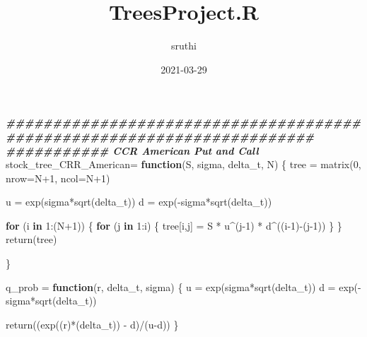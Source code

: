 \documentclass[
]{article}
\title{TreesProject.R}
\author{sruthi}
\date{2021-03-29}
\newenvironment{Shaded}{\begin{snugshade}}{\end{snugshade}}
\newcommand{\AttributeTok}[1]{\textcolor[rgb]{0.77,0.63,0.00}{#1}}
\newcommand{\ControlFlowTok}[1]{\textcolor[rgb]{0.13,0.29,0.53}{\textbf{#1}}}
\newcommand{\DecValTok}[1]{\textcolor[rgb]{0.00,0.00,0.81}{#1}}
\newcommand{\DocumentationTok}[1]{\textcolor[rgb]{0.56,0.35,0.01}{\textbf{\textit{#1}}}}
\newcommand{\FunctionTok}[1]{\textcolor[rgb]{0.00,0.00,0.00}{#1}}
\newcommand{\NormalTok}[1]{#1}
\newcommand{\OtherTok}[1]{\textcolor[rgb]{0.56,0.35,0.01}{#1}}
\newcommand{\SpecialCharTok}[1]{\textcolor[rgb]{0.00,0.00,0.00}{#1}}
\begin{document}
\maketitle

\begin{Shaded}
\begin{Highlighting}[]
\DocumentationTok{\#\#\#\#\#\#\#\#\#\#\#\#\#\#\#\#\#\#\#\#\#\#\#\#\#\#\#\#\#\#\#\#\#\#\#\#\#\#\#\#\#\#\#\#\#\#\#\#\#\#\#\#\#\#\#\#\#\#\#\#\#\#\#\#\#\#\#\#\#\#\#}
\DocumentationTok{\#\#\#\#\#\#\#\#\#\#\# CCR American Put and Call}
\NormalTok{stock\_tree\_CRR\_American}\OtherTok{=} \ControlFlowTok{function}\NormalTok{(S, sigma, delta\_t, N) \{}
\NormalTok{  tree }\OtherTok{=} \FunctionTok{matrix}\NormalTok{(}\DecValTok{0}\NormalTok{, }\AttributeTok{nrow=}\NormalTok{N}\SpecialCharTok{+}\DecValTok{1}\NormalTok{, }\AttributeTok{ncol=}\NormalTok{N}\SpecialCharTok{+}\DecValTok{1}\NormalTok{)}
  
\NormalTok{  u }\OtherTok{=} \FunctionTok{exp}\NormalTok{(sigma}\SpecialCharTok{*}\FunctionTok{sqrt}\NormalTok{(delta\_t))}
\NormalTok{  d }\OtherTok{=} \FunctionTok{exp}\NormalTok{(}\SpecialCharTok{{-}}\NormalTok{sigma}\SpecialCharTok{*}\FunctionTok{sqrt}\NormalTok{(delta\_t))}
  
  \ControlFlowTok{for}\NormalTok{ (i }\ControlFlowTok{in} \DecValTok{1}\SpecialCharTok{:}\NormalTok{(N}\SpecialCharTok{+}\DecValTok{1}\NormalTok{)) \{}
    \ControlFlowTok{for}\NormalTok{ (j }\ControlFlowTok{in} \DecValTok{1}\SpecialCharTok{:}\NormalTok{i) \{}
\NormalTok{      tree[i,j] }\OtherTok{=}\NormalTok{ S }\SpecialCharTok{*}\NormalTok{ u}\SpecialCharTok{\^{}}\NormalTok{(j}\DecValTok{{-}1}\NormalTok{) }\SpecialCharTok{*}\NormalTok{ d}\SpecialCharTok{\^{}}\NormalTok{((i}\DecValTok{{-}1}\NormalTok{)}\SpecialCharTok{{-}}\NormalTok{(j}\DecValTok{{-}1}\NormalTok{))}
\NormalTok{    \}}
\NormalTok{  \}}
  \FunctionTok{return}\NormalTok{(tree)}
  
\NormalTok{\}}

\NormalTok{q\_prob }\OtherTok{=} \ControlFlowTok{function}\NormalTok{(r, delta\_t, sigma) \{}
\NormalTok{  u }\OtherTok{=} \FunctionTok{exp}\NormalTok{(sigma}\SpecialCharTok{*}\FunctionTok{sqrt}\NormalTok{(delta\_t))}
\NormalTok{  d }\OtherTok{=} \FunctionTok{exp}\NormalTok{(}\SpecialCharTok{{-}}\NormalTok{sigma}\SpecialCharTok{*}\FunctionTok{sqrt}\NormalTok{(delta\_t))}
  
  \FunctionTok{return}\NormalTok{((}\FunctionTok{exp}\NormalTok{((r)}\SpecialCharTok{*}\NormalTok{(delta\_t)) }\SpecialCharTok{{-}}\NormalTok{ d)}\SpecialCharTok{/}\NormalTok{(u}\SpecialCharTok{{-}}\NormalTok{d))}
\NormalTok{\}}



\end{Highlighting}
\end{Shaded}
\end{document}
